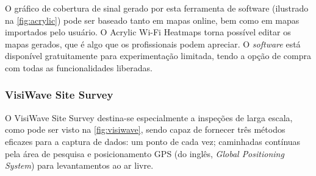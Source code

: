 O gráfico de cobertura  de sinal gerado por esta ferramenta de software (ilustrado na \autoref{fig:acrylic}) pode ser baseado tanto em mapas online, bem como em mapas importados pelo usuário. O Acrylic Wi-Fi Heatmaps torna possível editar os mapas gerados, que é algo que os profissionais podem apreciar. O \textit{software} está disponível gratuitamente para experimentação limitada, tendo a opção de compra com todas as funcionalidades liberadas.

\begin{figure}[H]
	\centering
\end{figure}

\subsubsection{VisiWave Site Survey}
\label{subsubsec:visiwave}

O VisiWave Site Survey destina-se especialmente a inspeções de larga escala, como pode ser visto na \autoref{fig:visiwave}, sendo capaz de fornecer três métodos eficazes para a captura de dados: um ponto de cada vez; caminhadas contínuas pela área de pesquisa e posicionamento GPS (do inglês, \textit{Global Positioning System}) para levantamentos ao ar livre. 

